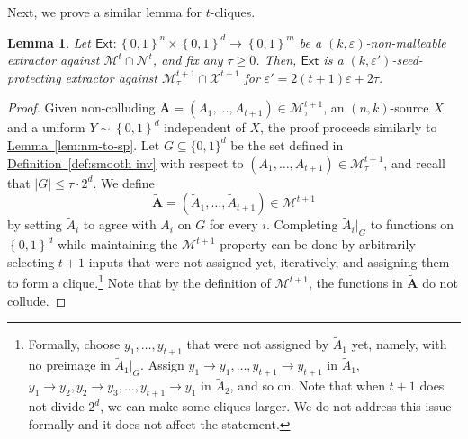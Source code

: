 \documentclass[11pt]{article}
\numberwithin{equation}{section}
\newtheorem{lemma}[theorem]{Lemma}
\theoremstyle{definition}
\theoremstyle{plain}
\newcommand{\expref}[2]{\hyperref[#2]{#1~\ref{#2}}}
\newcommand{\ext}{\mathsf{Ext}}
\newcommand{\eps}{\varepsilon}
\newcommand{\nc}{\mathcal{X}}
\newcommand{\set}[1]{\left\{{#1}\right\}}
\newcommand{\B}{\set{0,1}}
\def\MM{{\mathcal{M}}}
\begin{document}
Next, we prove a similar lemma for $t$-cliques. 
\begin{lemma}\label{lem:nm-to-sp2}
Let $\ext \colon \B^{n} \times \B^{d} \rightarrow \B^{m}$ be a $(k,\eps)$-non-malleable extractor
against $\MM^t \cap \mathcal{N}^{t}$, and fix any $\tau \ge 0$. Then, $\ext$ is a $(k,\eps')$-seed-protecting extractor against $\MM^{t+1}_{\tau} \cap \nc^{t+1}$ for
$\eps' = 2(t+1)\eps + 2\tau$. 
\end{lemma}
\begin{proof}
Given %
non-colluding  %
$\bm{A} = \left(A_1,\ldots,A_{t+1} \right) \in \MM_{\tau}^{t+1}$,
an $(n,k)$-source $X$ and a uniform $Y \sim \B^d$ independent of $X$,
the proof proceeds similarly to \expref{Lemma}{lem:nm-to-sp}. Let $G \subseteq \{0,1\}^d$ be the set defined in \expref{Definition}{def:smooth inv} with respect to $(A_1,\ldots,A_{t+1}) \in \MM^{t+1}_{\tau}$, and recall that $|G| \le \tau \cdot 2^d$.
We define 
%
%
\[\widetilde{\bm{A}} = \left(\widetilde{A}_1,\ldots,\widetilde{A}_{t+1}\right) \in \MM^{t+1}\]
by setting $\widetilde{A}_i$ to agree with $A_i$ on $G$ for every $i$.
%
Completing $\widetilde{A}_i|_{G}$ to functions on $\B^d$ while maintaining the $\MM^{t+1}$ property can
be done by arbitrarily selecting $t+1$ inputs that were not assigned yet, iteratively, and assigning them
to form a clique.\footnote{Formally, choose $y_1,\ldots,y_{t+1}$ that
were not assigned by $\widetilde{A}_1$ yet, namely, with no preimage in $\widetilde{A}_1|_G$. 
Assign $y_1 \rightarrow y_1,\ldots,y_{t+1} \rightarrow y_{t+1}$ in $\widetilde{A}_1$, 
$y_1 \rightarrow y_2,y_2 \rightarrow y_3,\ldots,y_{t+1}\rightarrow y_{1}$ in $\widetilde{A}_2$,
and so on. Note that when $t+1$ does not divide $2^d$, we can make some cliques larger. We do not address this issue formally and it does not affect the statement.}
Note that by the definition of $\MM^{t+1}$, the functions in $\widetilde{\bm{A}}$ do not collude.  



\end{proof}
\end{document}
